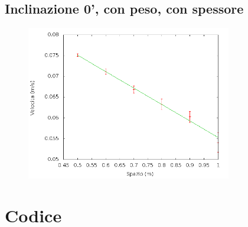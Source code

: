 \documentclass[12pt]{article} %
\begin{document}
	\subsection {Inclinazione 0', con peso, con spessore}
		\begin{figure}[H]
		\centering
		\includegraphics[width=0.8\textwidth]{velocita_0gradi_pesoalluminio}
		\label{fig:0ap}
	\end{figure}
 

\newpage
\section{Codice}
\end{document}
